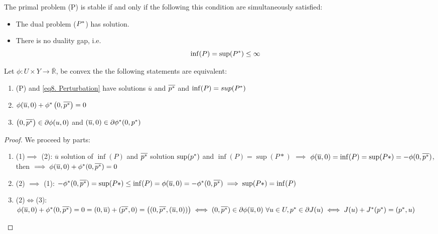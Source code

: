   \begin{theorem}
  	The primal problem (P) is stable 
  	if and only if the following this condition are simultaneously satisfied:
  	\begin{itemize}
  		\item The dual problem (${P}^{\ast}$) has solution.
  		\item There is no duality gap, i.e.
  		\[ 
	  		\inf(P)=\sup({P}^{\ast})\leq \infty
  		\]
  	\end{itemize}
 \end{theorem}	

\begin{theorem}
	Let $\phi:U\times Y \rightarrow \overline{\mathbb{R}}$, be convex the the following statements are equivalent:
	
	\begin{enumerate}[]
		\item (P) and \ref{eq8. Perturbation} have solutions $\overline{u}$ and $\overline{{p}^{\ast}}$ and $\inf(P)=sup({P}^{\ast})$
		\item $\phi(\overline{u}, 0)+{\phi}^{\ast}\left(0, \overline{{p}^{\ast}}\right)=0$
		\item $\left(0, \overline{{p}^{\ast}}\right) \in \partial \phi (u,0)$ and $ \left(\overline{u}, 0\right) \in \partial {\phi}^{\ast}(0,{p}^{\ast})$
	\end{enumerate}
	\begin{proof}
		We proceed by parts:
		\begin{enumerate}
			\item (1)$\implies$ (2): $\overline{u}$ solution of $\inf(P)$ and $\overline{{p}^{\ast}}$ solution $\sup({p}^{\ast})$ and $\inf(P)=\sup(P*)$ $\implies$
			$\phi(\overline{u},0)=\inf(P)=\sup(P*)=-\phi(0,\overline{{p}^{\ast}})$, then $\implies \phi(\overline{u}, 0)+{\phi}^{\ast}(0, \overline{{p}^{\ast}}) =0$
			\item (2) $\implies$ (1): $-{\phi}^{\ast}(0, \overline{{p}^{\ast}})=\sup(P*)\leq \inf(P)=\phi(\overline{u}, 0)=-{\phi}^{\ast}(0, \overline{{p}^{\ast}}) \implies \sup(P*)=\inf(P)$
			\item (2)$\iff$(3): $\phi(\overline{u},0)+{\phi}^{\ast}(0, \overline{{p}^{\ast}})=0=(0, \overline{u}) +(\overline{{p}^{\ast}},0)=\left((0, \overline{{p}^{\ast}}, (\overline{u},0))\right) \iff (0, \overline{{p}^{\ast}}) \in \partial\phi(\overline{u},0) \ \forall u \in U, {p}^{\ast} \in \partial J(u) \iff J(u)+{J}^{\ast}({p}^{\ast})=({p}^{\ast}, u)$
		\end{enumerate}
	\end{proof}
\end{theorem}
